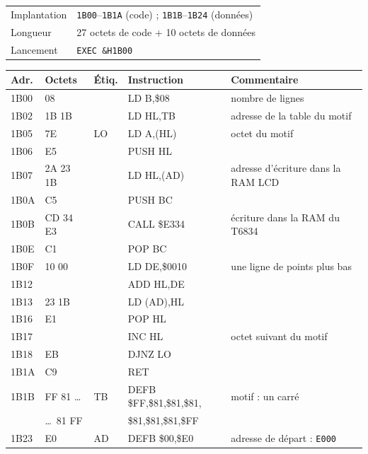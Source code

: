 \documentclass[a4paper,10pt]{article}
\makeatletter
\newcommand{\hex}[1]{\texttt{#1}}
\newcommand{\fiche}[3]{%
  \begin{center}\small
  \begin{tabular}{@{}ll@{}}
  \toprule
  Implantation & #1 \\
  Longueur & #2 \\
  Lancement & #3 \\
  \bottomrule
  \end{tabular}
  \end{center}}
\newenvironment{asm}
  {\small\begin{longtable}{@{}>{\ttfamily}l>{\ttfamily}l>{\ttfamily}l>{\ttfamily}l>{\raggedright\arraybackslash}p{6.2cm}@{}}
   \toprule
   \normalfont\bfseries Adr. & \normalfont\bfseries Octets & \normalfont\bfseries Étiq. & \normalfont\bfseries Instruction & \textbf{Commentaire}\\
   \midrule\endhead
   \bottomrule\endfoot}
  {\end{longtable}}
\makeatother
\begin{document}
\fiche{\hex{1B00}--\hex{1B1A} (code) ; \hex{1B1B}--\hex{1B24} (données)}%
      {27 octets de code + 10 octets de données}{\texttt{EXEC \&H1B00}}

\begin{asm}
1B00 & 06 08    &     & LD B,\$08      & nombre de lignes \\
1B02 & 21 1B 1B &     & LD HL,TB       & adresse de la table du motif \\
1B05 & 7E       & LO  & LD A,(HL)      & octet du motif \\
1B06 & E5       &     & PUSH HL        & \\
1B07 & 2A 23 1B &     & LD HL,(AD)     & adresse d'écriture dans la RAM LCD \\
1B0A & C5       &     & PUSH BC        & \\
1B0B & CD 34 E3 &     & CALL \$E334    & écriture dans la RAM du T6834 \\
1B0E & C1       &     & POP BC         & \\
1B0F & 11 10 00 &     & LD DE,\$0010   & une ligne de points plus bas \\
1B12 & 19       &     & ADD HL,DE      & \\
1B13 & 22 23 1B &     & LD (AD),HL     & \\
1B16 & E1       &     & POP HL         & \\
1B17 & 23       &     & INC HL         & octet suivant du motif \\
1B18 & 10 EB    &     & DJNZ LO        & \\
1B1A & C9       &     & RET            & \\
1B1B & FF 81 \dots & TB & DEFB \$FF,\$81,\$81,\$81, & motif : un carré \\
     & \dots\ 81 FF &   & \phantom{DEFB }\$81,\$81,\$81,\$FF & \\
1B23 & 00 E0    & AD  & DEFB \$00,\$E0 & adresse de départ : \hex{E000} \\
\end{asm}
\end{document}
